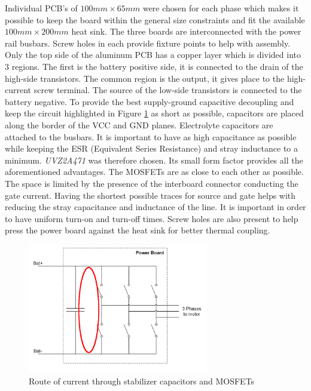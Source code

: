 Individual PCB's of $100mm \times 65mm$ were chosen for each phase which makes it possible to keep the board within the general size constraints and fit the available $100mm \times 200mm$ heat sink. The three boards are interconnected with the power rail busbars. Screw holes in each provide fixture points to help with assembly. Only the top side of the aluminum PCB has a copper layer which is divided into 3 regions. The first is the battery positive side, it is connected to the drain of the high-side transistors. The common region is the output, it gives place to the high-current screw terminal. The source of the low-side transistors is connected to the battery negative. To provide the best supply-ground capacitive decoupling and keep the circuit highlighted in Figure \ref{fig:cap_circ} as short as possible, capacitors are placed along the border of the VCC and GND planes. Electrolyte capacitors are attached to the busbars. It is important to have as high capacitance as possible while keeping the ESR (Equivalent Series Resistance) and stray inductance to a minimum. \textit{UVZ2A471}\cite{elco} was therefore chosen. Its small form factor provides all the aforementioned advantages. The MOSFETs are as close to each other as possible. The space is limited by the presence of the interboard connector conducting the gate current. Having the shortest possible traces for source and gate helps with reducing the stray capacitance and inductance of the line. It is important in order to have uniform turn-on and turn-off times. Screw holes are also present to help press the power board against the heat sink for better thermal coupling.

\begin{figure}[H]
	\centering
	\includegraphics[width=0.7\textwidth]{pictures/hardware/Power_Board/Sketch_of_powerBoard_circulating.PNG}
	\caption{Route of current through stabilizer capacitors and MOSFETs}
	\label{fig:cap_circ}
\end{figure}


